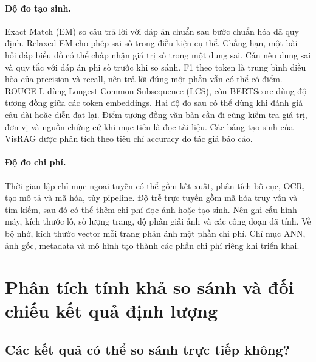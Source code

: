 \paragraph{Độ đo tạo sinh.}
Exact Match (EM) so câu trả lời với đáp án chuẩn sau bước
chuẩn hóa đã quy định. Relaxed EM cho phép sai số trong điều
kiện cụ thể. Chẳng hạn, một bài hỏi đáp biểu đồ có thể chấp nhận
giá trị số trong một dung sai. Cần nêu dung sai và quy tắc với
đáp án phi số trước khi so sánh. F1 theo token là trung bình điều
hòa của precision và recall, nên trả lời đúng một phần vẫn có
thể có điểm. ROUGE-L dùng Longest Common Subsequence (LCS), còn BERTScore
dùng độ tương đồng giữa các token embeddings. Hai độ đo sau có thể dùng
khi đánh giá câu dài hoặc diễn đạt lại. Điểm tương đồng văn bản
cần đi cùng kiểm tra giá trị, đơn vị và nguồn chứng cứ khi mục
tiêu là đọc tài liệu. Các bảng tạo sinh của VisRAG được phân
tích theo tiêu chí accuracy do tác giả báo cáo.

\paragraph{Độ đo chi phí.}
Thời gian lập chỉ mục ngoại tuyến có thể gồm kết xuất, phân
tích bố cục, OCR, tạo mô tả và mã hóa, tùy pipeline. Độ trễ
trực tuyến gồm mã hóa truy vấn và tìm kiếm, sau đó có thể thêm
chi phí đọc ảnh hoặc tạo sinh. Nên ghi cấu hình máy, kích thước
lô, số lượng trang, độ phân giải ảnh và các công đoạn đã tính.
Về bộ nhớ, kích thước vector mỗi trang phản ánh một phần chi
phí. Chỉ mục ANN, ảnh gốc, metadata và mô hình tạo thành các
phần chi phí riêng khi triển khai.

\section{Phân tích tính khả so sánh và đối chiếu kết quả định lượng}
\label{sec:exp_results}

\subsection{Các kết quả có thể so sánh trực tiếp không?}
\label{subsec:comparability}


